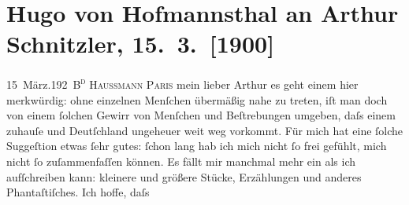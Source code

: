 

         
         \renewcommand{\erwaehntePersonen}{Personen: Richard Beer-Hofmann, Anatole France, Paul Goldmann, Hugo August von Hofmannsthal, Maurice Maeterlinck, Theofrastus Bombastus Paracelsus, Marie Reinhard, Auguste Rodin}
         \renewcommand{\erwaehnteOrte}{Orte: Berlin, Bois de Boulogne, Boulevard Haussmann, Deutschland, Florenz, Meudon, Paris, Villennes-sur-Seine, Wien}
         \renewcommand{\erwaehnteWerke}{Werke: Antigone, Paracelsus und Dr. Schnitzler, Vorspiel zur Antigone des Sophokles}
               \section[Hugo von Hofmannsthal an Arthur Schnitzler, 15. 3. {[}1900{]}]{ Hugo von Hofmannsthal an Arthur Schnitzler,
               15. 3. {[}1900{]}}\nopagebreak{}\rehead{ }\begin{ledgroupsized}[t]{13cm}\normalsize\beginnumbering \toendnotes[C]{\smallbreak\pagebreak[2]} 
\toendnotes[C]{\smallbreak}\pstart
           \noindent{}{\pb}15 März.\hfill \textsc{192 B\textsuperscript{d}
                           Haussmann}\pend
           \pstart
           \raggedleft{}\textsc{Paris}\pend
           \pstart{}mein lieber Arthur\pend\pstart
           es geht einem hier merkwürdig: ohne einzelnen Menſchen übermäßig nahe zu treten, iſt
               man doch von einem ſolchen Gewirr von Menſchen und Beſtrebungen umgeben, daſs einem
               zuhauſe und Deutſchland ungeheuer weit weg vorkommt.
               Für mich hat eine ſolche Suggeſtion etwas ſehr gutes: ſchon lang hab ich mich nicht
               ſo frei gefühlt, mich {\pb}nicht ſo
               zuſammenfaſſen können. Es fällt mir manchmal mehr ein als ich aufſchreiben kann:
               kleinere und größere Stücke, Erzählungen und anderes Phantaſtiſches. Ich hoffe, daſs

\end{ledgroupsized}
